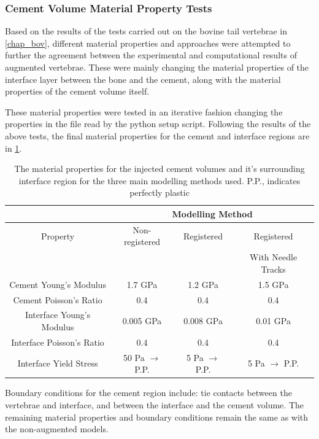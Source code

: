 \subsubsection{Cement Volume Material Property Tests} \label{sec:cemmatprop}

Based on the results of the tests carried out on the bovine tail vertebrae in
\cref{chap_bov}, different material properties and approaches were attempted to
further the agreement between the experimental and computational results of
augmented vertebrae.  These were mainly changing the material properties of the
interface layer between the bone and the cement, along with the material
properties of the cement volume itself.

These material properties were tested in an iterative fashion changing the
properties in the file read by the python setup script.
Following the results of the above tests, the final material properties for the
cement and interface regions are in \cref{tab:matprops4cmt}.

\begin{table}[h]
\centering
\caption{The material properties for the injected cement volumes and it's
	surrounding interface region for the three main modelling methods
used. P.P., indicates perfectly plastic}
\label{tab:matprops4cmt}
\begin{tabular}{c|c|c|c}
               & \multicolumn{3}{c}{Modelling Method}				\\
	\hline 
	Property	       & Non-registered & Registered & Registered  \\ 
			       &		&	     & With Needle
	Tracks \\ \hline
Cement Young's Modulus    &1.7 GPa            & 1.2 GPa       & 1.5 GPa \\
Cement Poisson's Ratio    &0.4                & 0.4           &0.4  \\ \hline
Interface Young's Modulus & 0.005 GPa          & 0.008 GPa      &0.01 GPa \\ 
Interface Poisson's Ratio & 0.4               & 0.4           & 0.4\\ 
Interface Yield Stress	  & 50 Pa $\rightarrow$ P.P.      & 5 Pa $\rightarrow$
P.P.  & 5 Pa $\rightarrow$ P.P.
\\ \hline
\end{tabular}
\end{table}

Boundary conditions for the cement region include: tie contacts between the
vertebrae and interface, and between the interface and the cement volume.
The remaining material properties and boundary conditions remain the same as
with the non-augmented models.

